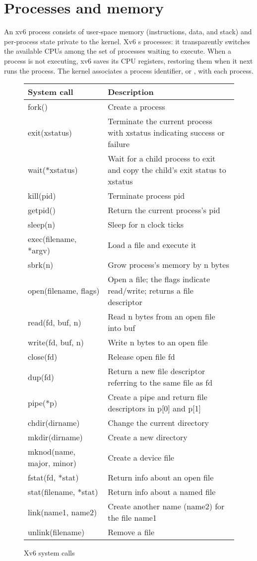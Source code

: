 \section{Processes and memory}

An xv6 process consists of user-space memory (instructions, data, and stack)
and per-process state private to the kernel.
Xv6 
s
processes: it transparently switches the available CPUs
among the set of processes waiting to execute.
When a process is not executing, xv6 saves its CPU registers,
restoring them when it next runs the process.
The kernel associates a process identifier, or
,
with each process.

\begin{figure}[t]
\center
\begin{tabular}{ll}
{\bf System call} & {\bf Description} \\
\midrule
fork() & Create a process \\
exit(xstatus) & Terminate the current process with xstatus indicating success or failure \\
wait(*xstatus) & Wait for a child process to exit and copy the child's exit status to xstatus \\
kill(pid) & Terminate process pid \\
getpid() & Return the current process's pid \\
sleep(n) & Sleep for n clock ticks \\
exec(filename, *argv) & Load a file and execute it \\
sbrk(n) & Grow process's memory by n bytes \\
open(filename, flags) & Open a file; the flags indicate read/write; returns a file descriptor \\
read(fd, buf, n) & Read n bytes from an open file into buf \\
write(fd, buf, n) & Write n bytes to an open file \\
close(fd) & Release open file fd \\
dup(fd) & Return a new file descriptor referring to the same file as fd \\
pipe(*p) & Create a pipe and return file descriptors in p[0] and p[1] \\
chdir(dirname) & Change the current directory \\
mkdir(dirname) & Create a new directory \\
mknod(name, major, minor) & Create a device file \\
fstat(fd, *stat) & Return info about an open file \\
stat(filename, *stat) & Return info about a named file \\
link(name1, name2) & Create another name (name2) for the file name1 \\
unlink(filename) & Remove a file \\
\end{tabular}
\caption{Xv6 system calls}
\label{fig:api}
\end{figure}

